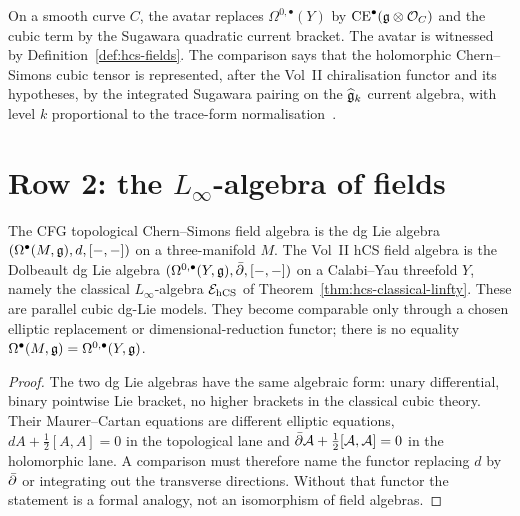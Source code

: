 \begin{remark}
\label{rem:cfg-row-1-avatar}
On a smooth curve $C$, the avatar replaces $\Omega^{0,\bullet}(Y)$ by
$\mathrm{CE}^\bullet(\mathfrak{g}\otimes\mathcal{O}_C)$ and the cubic term by the Sugawara
quadratic current bracket. The avatar is witnessed by
Definition~\ref{def:hcs-fields}. The comparison says that the
holomorphic Chern--Simons cubic tensor is represented, after the
Vol~II chiralisation functor and its hypotheses, by the integrated
Sugawara pairing on the $\widehat{\mathfrak{g}}_k$ current algebra, with level
$k$ proportional to the trace-form normalisation~\cite{CostelloYangian}.
\end{remark}

\section{\texorpdfstring{Row 2: the $L_\infty$-algebra of fields}{Row 2: the L-infinity algebra of fields}}
\label{sec:cfg-row-2-linfty}

\begin{theorem}
\label{thm:cfg-row-2}
The CFG topological Chern--Simons field algebra is the dg Lie algebra
$(\Omega^\bullet(M,\mathfrak{g}),d,[-,-])$ on a three-manifold $M$. The Vol~II
hCS field algebra is the Dolbeault dg Lie algebra
$(\Omega^{0,\bullet}(Y,\mathfrak{g}),\bar\partial,[-,-])$ on a Calabi--Yau threefold $Y$, namely
the classical $L_\infty$-algebra $\mathcal{E}_{\mathrm{hCS}}$ of
Theorem~\ref{thm:hcs-classical-linfty}. These are parallel cubic
dg-Lie models. They become comparable only through a chosen elliptic
replacement or dimensional-reduction functor; there is no equality
$\Omega^\bullet(M,\mathfrak{g})=\Omega^{0,\bullet}(Y,\mathfrak{g})$.
\end{theorem}

\begin{proof}
The two dg Lie algebras have the same algebraic form: unary
differential, binary pointwise Lie bracket, no higher brackets in the
classical cubic theory. Their Maurer--Cartan equations are different
elliptic equations, $dA+\tfrac12[A,A]=0$ in the topological lane and
$\bar\partial\mathcal{A}+\tfrac12[\mathcal{A},\mathcal{A}]=0$ in the holomorphic lane. A comparison
must therefore name the functor replacing $d$ by $\bar\partial$ or integrating
out the transverse directions. Without that functor the statement is a
formal analogy, not an isomorphism of field algebras.
\end{proof}

